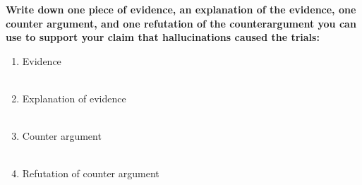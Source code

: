 \documentclass[12pt]{article}
\begin{document}
\begin{tcolorbox}[colframe=black!60, colback=white, 
coltitle=black, colbacktitle=black!15, fonttitle=\bfseries\Large, 
title=Guided Practice, halign title=center, left=10pt, right=10pt, top=10pt, bottom=15pt]
\textbf{Write down one piece of evidence, an explanation of the evidence, one counter argument, and one refutation of the counterargument you can use to support your claim that hallucinations caused the trials:}
\begin{enumerate}[itemsep=3em] %
    \item Evidence
    \\[0.8cm] \underline{\hspace{14.3cm}}  
    \\[0.8cm] \underline{\hspace{14.3cm}} 
    \item Explanation of evidence
     \\[0.8cm] \underline{\hspace{14.3cm}}  
    \\[0.8cm] \underline{\hspace{14.3cm}} 
    \item Counter argument
       \\[0.8cm] \underline{\hspace{14.3cm}}  
    \\[0.8cm] \underline{\hspace{14.3cm}} 
    \item     Refutation of counter argument
       \\[0.8cm] \underline{\hspace{14.3cm}}  
    \\[0.8cm] \underline{\hspace{14.3cm}} 

\vspace{1.5em}\end{enumerate}
\end{tcolorbox}
\vspace{2em}
\end{document}
